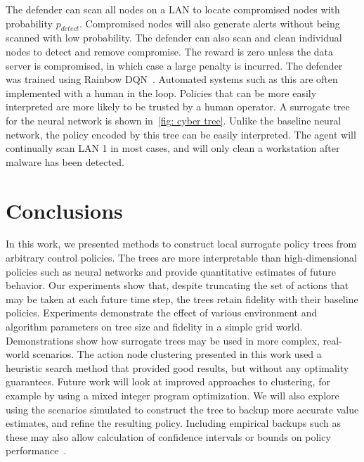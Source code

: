 \documentclass[letterpaper]{article} %
\begin{document}
\vspace{-1.57mm}  The defender can scan all nodes on a LAN to locate compromised nodes with probability $p_{detect}$.
Compromised nodes will also generate alerts without being scanned with low probability.
The defender can also scan and clean individual nodes to detect and remove compromise.
The reward is zero unless the data server is compromised, in which case a large penalty is incurred.
The defender was trained using Rainbow DQN~\cite{hessel2018}.  Automated systems such as this are often implemented with a human in the loop.
Policies that can be more easily interpreted are more likely to be trusted by a human operator.
A surrogate tree for the neural network is shown in~\cref{fig: cyber tree}.
Unlike the baseline neural network, the policy encoded by this tree can be easily interpreted.
The agent will continually scan LAN 1 in most cases, and will only clean a workstation after malware has been detected.

\vspace{-0.95mm}
\section{Conclusions}
In this work, we presented methods to construct local surrogate policy trees from arbitrary control policies.
The trees are more interpretable than high-dimensional policies such as neural networks and provide quantitative estimates of future behavior.
Our experiments show that, despite truncating the set of actions that may be taken at each future time step, the trees retain fidelity with their baseline policies.
Experiments demonstrate the effect of various environment and algorithm parameters on tree size and fidelity in a simple grid world.
Demonstrations show how surrogate trees may be used in more complex, real-world scenarios.  The action node clustering presented in this work used a heuristic search method that provided good results, but without any optimality guarantees.
Future work will look at improved approaches to clustering, for example by using a mixed integer program optimization.
We will also explore using the scenarios simulated to construct the tree to backup more accurate value estimates, and refine the resulting policy.
Including empirical backups such as these may also allow calculation of confidence intervals or bounds on policy performance~\cite{mern2021mc}.
\end{document}

